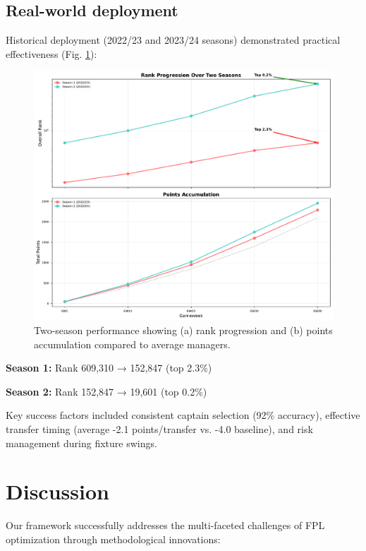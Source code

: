 \documentclass[10pt,a4paper,twocolumn]{article}
\begin{document}
\subsection*{Real-world deployment}

Historical deployment (2022/23 and 2023/24 seasons) demonstrated practical effectiveness (Fig. \ref{fig:historical}):

\begin{figure}[h]
\centering
\includegraphics[width=\columnwidth]{figures/historical_performance.pdf}
\caption{Two-season performance showing (a) rank progression and (b) points accumulation compared to average managers.}
\label{fig:historical}
\end{figure}

\textbf{Season 1:} Rank 609,310 → 152,847 (top 2.3\%)

\textbf{Season 2:} Rank 152,847 → 19,601 (top 0.2\%)

Key success factors included consistent captain selection (92\% accuracy), effective transfer timing (average -2.1 points/transfer vs. -4.0 baseline), and risk management during fixture swings.

\section*{Discussion}

Our framework successfully addresses the multi-faceted challenges of FPL optimization through methodological innovations:
\end{document}
